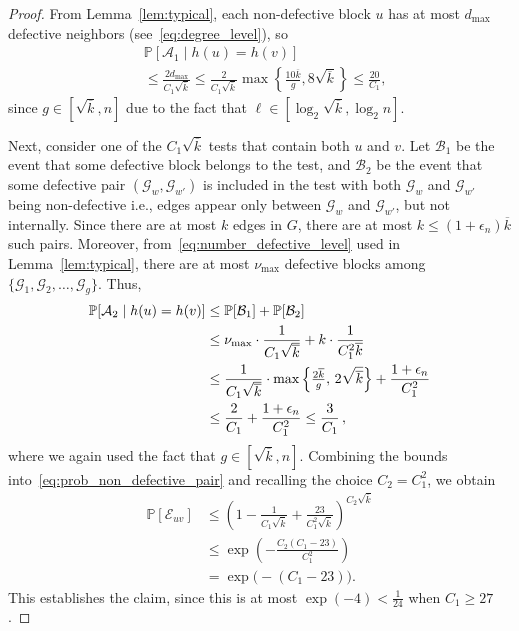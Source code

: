 \documentclass[journal]{IEEEtran}
\theoremstyle{definition}
\theoremstyle{definition}
\newcommand{\Ac}{\mathcal{A}}
\newcommand{\Bc}{\mathcal{B}}
\newcommand{\Ec}{\mathcal{E}}
\newcommand{\Gc}{\mathcal{G}}
\newcommand{\PP}{\mathbb{P}}
\newcommand{\PV}{\nu}
\newcommand{\kb}{\overline{k}}
\begin{document}
\begin{proof}
From Lemma~\ref{lem:typical}, each non-defective block $u$ has at most $d_{\max}$ defective neighbors (see~\eqref{eq:degree_level}), so
\[
\begin{aligned}
  &\PP[\Ac_1 \mid  h(u)=h(v)] \\
  &\leq \frac{2d_{\max}}{C_1\sqrt{\kb}} 
  \leq \frac{2}{C_1\sqrt{\kb}} \max \left\{ \frac{10\kb}{g}, 8\sqrt{\kb} \right\} 
  \leq \frac{20}{C_1},
\end{aligned}
\]
since $g \in [\sqrt{\kb},n]$ due to the fact that $\ell \in [\log_2 \sqrt{\kb},\log_2 n]$.

Next, consider one of the \(C_1\sqrt{\kb}\) tests that contain both \(u\) and \(v\). Let $\Bc_1$ be the event that some defective block belongs to the test, and $\Bc_2$ be the event that some defective pair $(\Gc_{w},\Gc_{w'})$ is included in the test with both $\Gc_{w}$ and $\Gc_{w'}$ being non-defective i.e., edges appear only between $\Gc_{w}$ and $\Gc_{w'}$, but not internally. Since there are at most $k$ edges in $G$, there are at most $k \le (1+\epsilon_n)\kb$ such pairs. Moreover, from~\eqref{eq:number_defective_level} used in Lemma~\ref{lem:typical}, there are at most $\PV_{\max}$ defective blocks among $\{\Gc_1,\Gc_2,\dots,\Gc_g \}$. Thus,
\begin{align}
\PP[\Ac_2 \mid  h(u)=h(v)]  
   &\leq \mathbb{P}[\Bc_1] + \mathbb{P}[\Bc_2] \notag\\
   &\leq \PV_{\max} \cdot \frac{1}{C_1 \sqrt{\kb}} 
       + k \cdot \frac{1}{C_1^2 \kb} \notag\\
   &\leq \frac{1}{C_1 \sqrt{\kb}} 
       \cdot \max \left\{ \tfrac{2\kb}{g},\, 2\sqrt{\kb} \right\} 
       + \frac{1+\epsilon_n}{C_1^2} \notag\\
   &\leq \frac{2}{C_1} + \frac{1+\epsilon_n}{C_1^2} 
       \leq \frac{3}{C_1}\, , \label{eq:bound-Y}
\end{align}
where we again used the fact that $g \in [\sqrt{\kb}, n]$. Combining the bounds into~\eqref{eq:prob_non_defective_pair} and recalling the choice $C_2 = C_1^2$, we obtain
\[
\begin{aligned}
    \PP[\Ec_{uv}] &\leq \left(1 - \frac{1}{C_1\sqrt{\kb}} + \frac{23}{C_1^2\sqrt{\kb}} \right)^{C_2\sqrt{\kb}}\\
  &\leq \exp \left(-\frac{C_2(C_1-23)}{C_1^2}\right)\\
  &= \exp\big(-(C_1-23)\big).
\end{aligned}
\]
This establishes the claim, since this is at most $\exp(-4)< \frac{1}{24}$ when $C_1 \geq 27$.
\end{proof}
\end{document}
